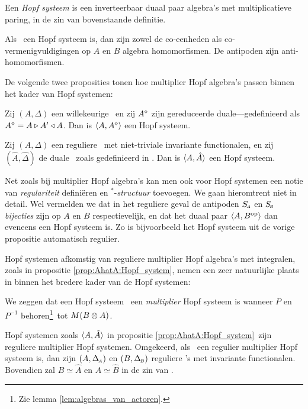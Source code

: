\documentclass{book}
\begin{document}
\begin{defn} \rm
Een {\em Hopf systeem\/} is een inverteerbaar duaal paar algebra's met
multiplicatieve paring, in de zin van bovenstaande definitie.
\end{defn}


\begin{prop}
Als\/ \pairAB\ een Hopf systeem is, dan zijn zowel de co-eenheden als
co-vermenigvuldigingen op\/ $A$ en\/ $B$ algebra homomorfismen.
De antipoden zijn anti-homomorfismen.
\end{prop}


De volgende twee proposities tonen hoe multiplier Hopf algebra's passen binnen het
kader van Hopf systemen:


\begin{prop}
Zij\/ $(A,\Delta)$ een willekeurige \mha\ en zij $A^\diamond$ zijn
gereduceerde duale---gedefinieerd als $A^\diamond = A\triangleright A' \triangleleft A$.
Dan is $\langle A,A^\diamond \rangle$ een Hopf systeem.
\end{prop}


\begin{prop} \label{prop:AhatA:Hopf_system}
Zij\/ $(A,\Delta)$ een reguliere \mha\ met niet-triviale invariante functionalen,
en zij\/ $(\hat{A},\hat{\Delta})$ de duale \mha\ zoals gedefinieerd in \cite{Fons:AFGD}\@.
Dan is $\langle A,\hat{A} \rangle$ een Hopf systeem.
\end{prop}

Net zoals bij multiplier Hopf algebra's kan men ook voor Hopf systemen een notie
van {\em regulariteit\/} defini\"eren en $^*$-{\em structuur\/} toevoegen.
We gaan hieromtrent niet in detail.
Wel vermelden we dat in het reguliere geval de antipoden $S_{\scriptscriptstyle \! A}$ en $S_{\scriptscriptstyle \! B}$
{\em bijecties\/} zijn op $A$ en $B$ respectievelijk, en dat het duaal paar
$\langle A,B^{\rm op} \rangle$ dan eveneens een Hopf systeem is.
Zo is bijvoorbeeld het Hopf systeem uit de vorige propositie automatisch regulier.

Hopf systemen afkomstig van reguliere multiplier Hopf algebra's met integralen,
zoals in propositie \ref{prop:AhatA:Hopf_system}, nemen een zeer natuurlijke
plaats in binnen het bredere kader van de Hopf systemen:


\begin{defn} \rm
We zeggen dat een Hopf systeem \pairAB\ een {\em multiplier\/} Hopf systeem is
wanneer $P$ en $P^{-1}$ behoren\footnote{Zie lemma \ref{lem:algebras_van_actoren}\@.}\
tot $M(B \otimes A)$.
\end{defn}


\begin{thm} \label{thm:mhs}
Hopf systemen zoals\/ $\langle A,\hat{A} \rangle$ in propositie \ref{prop:AhatA:Hopf_system}\
zijn reguliere multiplier Hopf systemen.
Omgekeerd, als\/ \pairAB\ een regulier multiplier Hopf systeem is,
dan zijn $(A,\Delta_{\scriptscriptstyle \! A})$ en\/ $(B,\Delta_{\scriptscriptstyle \! B})$ reguliere \mha's met invariante functionalen.
Bovendien zal\/ $B\simeq \hat{A}$ en\/ $A\simeq \hat{B}$ in de zin van \cite{Fons:AFGD}\@.
\end{thm}
\end{document}
